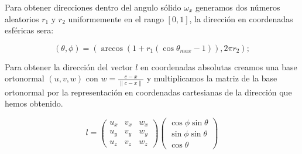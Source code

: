 \medskip

Para obtener direcciones dentro del angulo sólido $\omega_x$ generamos dos números aleatorios $r_1$ y $r_2$ uniformemente en el rango $[0, 1]$, la dirección en coordenadas esféricas sera:

\begin{equation}
(\theta, \phi) = (\arccos (1 + r_1 (\cos \theta_{max} - 1)), 2\pi r_2);
\end{equation}

\clearpage

Para obtener la dirección del vector $l$ en coordenadas absolutas creamos una base ortonormal $(u, v, w)$ con $w = \frac{c - x}{\lVert c - x \rVert}$ y multiplicamos la matriz de la base ortonormal por la representación en coordenadas cartesianas de la dirección que hemos obtenido.

\begin{equation}
l = \begin{pmatrix}
u_x & v_x & w_x \\
u_y & v_y & w_y \\
u_z & v_z & w_z
\end{pmatrix}
\begin{pmatrix}
\cos \phi \sin \theta \\
\sin \phi \sin \theta \\
\cos \theta
\end{pmatrix}
\end{equation}





